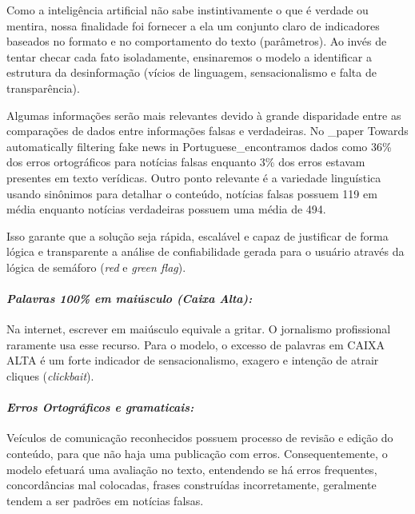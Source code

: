 \documentclass[
  brazilian,
  11pt,
]{article}
\begin{document}
Como a inteligência artificial não sabe instintivamente o que é verdade ou mentira, nossa finalidade foi fornecer a ela um conjunto claro de indicadores baseados no formato e no comportamento do texto (parâmetros). Ao invés de tentar checar cada fato isoladamente, ensinaremos o modelo a identificar a estrutura da desinformação (vícios de linguagem, sensacionalismo e falta de transparência).

Algumas informações serão mais relevantes devido à grande disparidade entre as comparações de dados entre informações falsas e verdadeiras. No \_paper Towards automatically filtering fake news in Portuguese\_encontramos dados como 36\% dos erros ortográficos para notícias falsas enquanto 3\% dos erros estavam presentes em texto verídicas. Outro ponto relevante é a variedade linguística usando sinônimos para detalhar o conteúdo, notícias falsas possuem 119 em média enquanto notícias verdadeiras possuem uma média de 494.

Isso garante que a solução seja rápida, escalável e capaz de justificar de forma lógica e transparente a análise de confiabilidade gerada para o usuário através da lógica de semáforo (\emph{red} e \emph{green flag}).

\paragraph{\texorpdfstring{\emph{Palavras 100\% em maiúsculo (Caixa Alta):}}{Palavras 100\% em maiúsculo (Caixa Alta):}}\label{palavras-100-em-maiuxfasculo-caixa-alta}

Na internet, escrever em maiúsculo equivale a gritar. O jornalismo profissional raramente usa esse recurso. Para o modelo, o excesso de palavras em CAIXA ALTA é um forte indicador de sensacionalismo, exagero e intenção de atrair cliques (\emph{clickbait}).

\paragraph{\texorpdfstring{\emph{Erros Ortográficos e gramaticais:}}{Erros Ortográficos e gramaticais:}}\label{erros-ortogruxe1ficos-e-gramaticais}

Veículos de comunicação reconhecidos possuem processo de revisão e edição do conteúdo, para que não haja uma publicação com erros. Consequentemente, o modelo efetuará uma avaliação no texto, entendendo se há erros frequentes, concordâncias mal colocadas, frases construídas incorretamente, geralmente tendem a ser padrões em notícias falsas.
\end{document}
